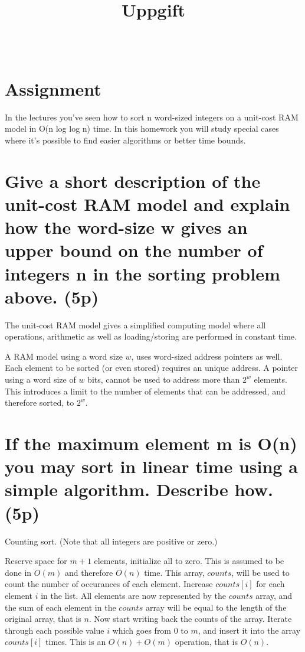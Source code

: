 \documentclass[a4paper,10pt,titlepage]{article}
\title{\courseName\\\vspace{4pt}Uppgift \assignmentNumber}
\date{\writtenDate}
\author{\myName\\\emph{\myEmail}}
\begin{document}
\maketitle

\section*{Assignment}
In the lectures you've seen how to sort n word-sized integers on a unit-cost RAM model in O(n log log n) time. In this homework you will study special cases where it's possible to find easier algorithms or better time bounds. 


\section{Give a short description of the unit-cost RAM model and explain how the word-size w gives an upper bound on the number of integers n in the sorting problem above. (5p)}

The unit-cost RAM model gives a simplified computing model where all operations, arithmetic as well as loading/storing are performed in constant time.

A RAM model using a word size $w$, uses word-sized address pointers as well. Each element to be sorted (or even stored) requires an unique address. A pointer using a word size of $w$ bits, cannot be used to address more than $2^w$ elements. This introduces a limit to the number of elements that can be addressed, and therefore sorted, to $2^w$.


\section {If the maximum element m is O(n) you may sort in linear time using a simple algorithm. Describe how. (5p) }

Counting sort. (Note that all integers are positive or zero.)

Reserve space for $m+1$ elements, initialize all to zero. This is assumed to be done in $O(m)$ and therefore $O(n)$ time. This array, $counts$, will be used to count the number of occurances of each element. Increase $counts[i]$ for each element $i$ in the list. All elements are now represented by the $counts$ array, and the sum of each element in the $counts$ array will be equal to the length of the original array, that is $n$. Now start writing back the counts of the array. Iterate through each possible value $i$ which goes from $0$ to $m$, and insert it into the array $counts[i]$ times. This is an $O(n) + O(m)$ operation, that is $O(n)$.
\end{document}
